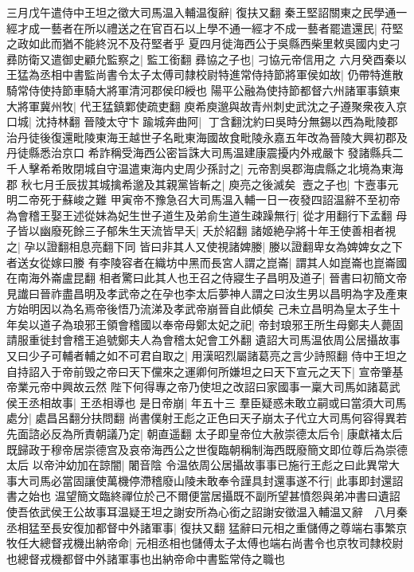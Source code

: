 三月戊午遣侍中王坦之徵大司馬温入輔温復辭|{
	復扶又翻}
秦王堅詔關東之民學通一經才成一藝者在所以禮送之在官百石以上學不通一經才不成一藝者罷遣還民|{
	苻堅之政如此而猶不能終況不及苻堅者乎}
夏四月徙海西公于吳縣西柴里敕吳國内史刁彞防衛又遣御史顧允監察之|{
	監工銜翻}
彞協之子也|{
	刁協元帝信用之}
六月癸酉秦以王猛為丞相中書監尚書令太子太傅司隸校尉特進常侍持節將軍侯如故|{
	仍帶特進散騎常侍使持節車騎大將軍清河郡侯印綬也}
陽平公融為使持節都督六州諸軍事鎮東大將軍冀州牧|{
	代王猛鎮鄴使疏吏翻}
庾希庾邈與故青州刺史武沈之子遵聚衆夜入京口城|{
	沈持林翻}
晉陵太守卞踰城奔曲阿|{
	丁含翻沈約曰吳時分無錫以西為毗陵郡治丹徒後復還毗陵東海王越世子名毗東海國故食毗陵永嘉五年改為晉陵大興初郡及丹徒縣悉治京口}
希詐稱受海西公密旨誅大司馬温建康震擾内外戒嚴卞發諸縣兵二千人擊希希敗閉城自守温遣東海内史周少孫討之|{
	元帝割吳郡海虞縣之北境為東海郡}
秋七月壬辰拔其城擒希邈及其親黨皆斬之|{
	庾亮之後滅矣}
壼之子也|{
	卞壼事元明二帝死于蘇峻之難}
甲寅帝不豫急召大司馬温入輔一日一夜發四詔温辭不至初帝為會稽王娶王述從妹為妃生世子道生及弟俞生道生疎躁無行|{
	從才用翻行下孟翻}
母子皆以幽廢死餘三子郁朱生天流皆早夭|{
	夭於紹翻}
諸姬絶孕將十年王使善相者視之|{
	孕以證翻相息亮翻下同}
皆曰非其人又使視諸婢媵|{
	媵以證翻卑女為婢婢女之下者送女從嫁曰媵}
有李陵容者在織坊中黑而長宮人謂之崑崙|{
	謂其人如崑崙也崑崙國在南海外崙盧昆翻}
相者驚曰此其人也王召之侍寢生子昌明及道子|{
	晉書曰初簡文帝見䜟曰晉祚盡昌明及孝武帝之在孕也李太后夢神人謂之曰汝生男以昌明為字及產東方始明因以為名焉帝後悟乃流涕及孝武帝崩晉自此傾矣}
己未立昌明為皇太子生十年矣以道子為琅邪王領會稽國以奉帝母鄭太妃之祀|{
	帝封琅邪王所生母鄭夫人薨固請服重徙封會稽王追號鄭夫人為會稽太妃會工外翻}
遺詔大司馬温依周公居攝故事又曰少子可輔者輔之如不可君自取之|{
	用漢昭烈屬諸葛亮之言少詩照翻}
侍中王坦之自持詔入于帝前毁之帝曰天下儻來之運卿何所嫌坦之曰天下宣元之天下|{
	宣帝肇基帝業元帝中興故云然}
陛下何得專之帝乃使坦之改詔曰家國事一稟大司馬如諸葛武侯王丞相故事|{
	王丞相導也}
是日帝崩|{
	年五十三}
羣臣疑惑未敢立嗣或曰當須大司馬處分|{
	處昌呂翻分扶問翻}
尚書僕射王彪之正色曰天子崩太子代立大司馬何容得異若先面諮必反為所責朝議乃定|{
	朝直遥翻}
太子即皇帝位大赦崇德太后令|{
	康獻褚太后既歸政于穆帝居崇德宫及哀帝海西公之世復臨朝稱制海西既廢簡文即位尊后為崇德太后}
以帝沖幼加在諒闇|{
	闍音陰}
令温依周公居攝故事事已施行王彪之曰此異常大事大司馬必當固讓使萬機停滯稽廢山陵未敢奉令謹具封還事遂不行|{
	此事即封還詔書之始也}
温望簡文臨終禪位於己不爾便當居攝既不副所望甚憤怨與弟冲書曰遺詔使吾依武侯王公故事耳温疑王坦之謝安所為心銜之詔謝安徵温入輔温又辭　八月秦丞相猛至長安復加都督中外諸軍事|{
	復扶又翻}
猛辭曰元相之重儲傅之尊端右事繁京牧任大總督戎機出納帝命|{
	元相丞相也儲傅太子太傅也端右尚書令也京牧司隸校尉也總督戎機都督中外諸軍事也出納帝命中書監常侍之職也}
